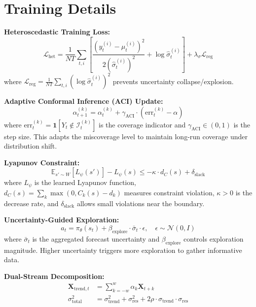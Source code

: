\documentclass{article}
\theoremstyle{plain}
\theoremstyle{definition}
\theoremstyle{remark}
\begin{document}
\section{Training Details}
\label{app:training}

\textbf{Heteroscedastic Training Loss:}
\begin{equation}
\mathcal{L}_{\text{het}} = \frac{1}{NT}\sum_{t,i}\left[\frac{(y_t^{(i)} - \hat{\mu}_t^{(i)})^2}{2(\hat{\sigma}_t^{(i)})^2} + \log \hat{\sigma}_t^{(i)}\right] + \lambda_\sigma \mathcal{L}_{\text{reg}}
\label{eq:het_nll}
\end{equation}
where $\mathcal{L}_{\text{reg}} = \frac{1}{NT}\sum_{t,i}(\log \hat{\sigma}_t^{(i)})^2$ prevents uncertainty collapse/explosion.

\textbf{Adaptive Conformal Inference (ACI) Update:}
\begin{equation}
\alpha_{t+1}^{(k)} = \alpha_t^{(k)} + \gamma_{\text{ACI}} \cdot (\text{err}_t^{(k)} - \alpha)
\label{eq:aci_app}
\end{equation}
where $\text{err}_t^{(k)} = \mathbf{1}[Y_t \notin \mathcal{I}_t^{(k)}]$ is the coverage indicator and $\gamma_{\text{ACI}} \in (0,1)$ is the step size. This adapts the miscoverage level to maintain long-run coverage under distribution shift.

\textbf{Lyapunov Constraint:}
\begin{equation}
\mathbb{E}_{s' \sim W}[L_\psi(s')] - L_\psi(s) \leq -\kappa \cdot d_C(s) + \delta_{\text{slack}}
\label{eq:lyap_constraint_app}
\end{equation}
where $L_\psi$ is the learned Lyapunov function, $d_C(s) = \sum_k \max(0, C_k(s) - d_k)$ measures constraint violation, $\kappa > 0$ is the decrease rate, and $\delta_{\text{slack}}$ allows small violations near the boundary.

\textbf{Uncertainty-Guided Exploration:}
\begin{equation}
a_t = \pi_\theta(s_t) + \beta_{\text{explore}} \cdot \bar{\sigma}_t \cdot \epsilon, \quad \epsilon \sim \mathcal{N}(0, I)
\label{eq:explore_app}
\end{equation}
where $\bar{\sigma}_t$ is the aggregated forecast uncertainty and $\beta_{\text{explore}}$ controls exploration magnitude. Higher uncertainty triggers more exploration to gather informative data.

\textbf{Dual-Stream Decomposition:}
\begin{align}
\mathbf{X}_{\text{trend},t} &= \sum_{k=-w}^{w} \alpha_k \mathbf{X}_{t+k} \\
\sigma_{\text{total}}^2 &= \sigma_{\text{trend}}^2 + \sigma_{\text{res}}^2 + 2\rho \cdot \sigma_{\text{trend}} \cdot \sigma_{\text{res}}
\end{align}
\end{document}
